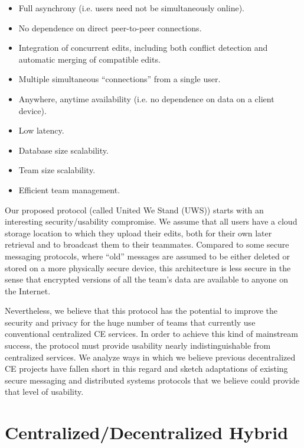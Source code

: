\documentclass[runningheads]{llncs}
\begin{document}
\begin{itemize}
\item Full asynchrony (i.e. users need not be simultaneously online).
\item No dependence on direct peer-to-peer connections.
\item Integration of concurrent edits, including both conflict detection and automatic merging of compatible edits.
\item Multiple simultaneous ``connections'' from a single user.
\item Anywhere, anytime availability (i.e. no dependence on data on a client device).
\item Low latency.
\item Database size scalability.
\item Team size scalability.
\item Efficient team management.
\end{itemize}

Our proposed protocol (called United We Stand (UWS)) starts with an interesting security{\slash}usability compromise.
We assume that all users have a cloud storage location to which they upload their edits, both for their own later retrieval and to broadcast them to their teammates.
Compared to some secure messaging protocols, where ``old'' messages are assumed to be either deleted or stored on a more physically secure device, this architecture is less secure in the sense that encrypted versions of all the team's data are available to anyone on the Internet.

Nevertheless, we believe that this protocol has the potential to improve the security and privacy for the huge number of teams that currently use conventional centralized CE services.
In order to achieve this kind of mainstream success, the protocol must provide usability nearly indistinguishable from centralized services.
We analyze ways in which we believe previous decentralized CE projects have fallen short in this regard and sketch adaptations of existing secure messaging and distributed systems protocols that we believe could provide that level of usability.

\section{Centralized{\slash}Decentralized Hybrid}
\end{document}
